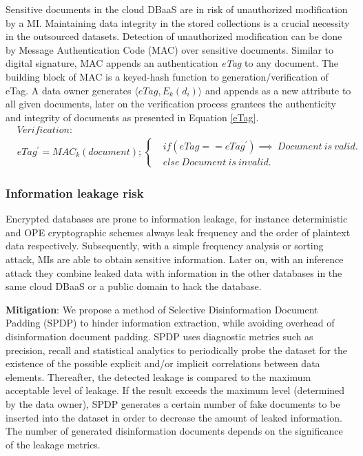 Sensitive documents in the cloud DBaaS are in risk of unauthorized modification by a MI. Maintaining data integrity in the stored collections is a crucial necessity in the outsourced datasets. Detection of unauthorized modification can be done by Message Authentication Code (MAC) over sensitive documents. Similar to digital signature, MAC appends an authentication \textit{eTag} to any document. The building block of MAC is a keyed-hash function to generation/verification of eTag. A data owner generates $\langle eTag, E_k(d_i)\rangle$ and appends as a new attribute to all given documents, later on the verification process grantees the authenticity and integrity of documents as presented in Equation \ref{eTag}.   
\begin{equation}
\label{eTag}
\begin{aligned}
&Verification: \\
&eTag^{'}= MAC_k(document); \begin{cases}
&if (eTag==eTag^{'}) \implies ~ Document~is~valid.\\
&else~ Document~ is~ invalid. 
\end{cases}
\end{aligned}
\end{equation}



\subsubsection*{Information leakage risk}
\label{subsec:ConfidentialityViolation}
Encrypted databases are prone to information leakage, for instance deterministic and OPE cryptographic schemes always leak frequency and the order of plaintext data respectively. Subsequently, with a simple frequency analysis or sorting attack, MIs are able to obtain sensitive information. Later on, with an inference attack they combine leaked data with information in the other databases in the same cloud DBaaS or a public domain to hack the database.
 
\textbf{Mitigation}: We propose a method of Selective Disinformation Document Padding (SPDP) to hinder information extraction, while avoiding overhead of disinformation document padding. SPDP uses diagnostic metrics such as precision, recall and statistical analytics to periodically probe the dataset for the existence of the possible explicit and/or implicit correlations between data elements. Thereafter, the detected leakage is compared to the maximum acceptable level of leakage. If the result exceeds the maximum level (determined by the data owner), SPDP generates a certain number of fake documents to be inserted into the dataset in order to decrease the amount of leaked information. The number of generated disinformation documents depends on the significance of the leakage metrics.\\

